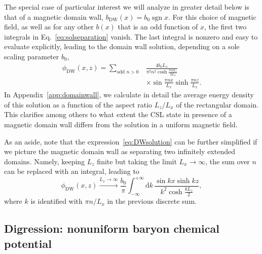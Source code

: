 \documentclass[pdflatex,iicol,sn-mathphys-num]{sn-jnl}
\let\p=\phi
\newcommand{\dd}{\text{d}}%
\newcommand{\bmag}{b}%
\begin{document}
The special case of particular interest we will analyze in greater detail below is that of a magnetic domain wall, $\bmag_\text{DW}(x)=\bmag_0\operatorname{sgn}x$. For this choice of magnetic field, as well as for any other $\bmag(x)$ that is an odd function of $x$, the first two integrals in Eq.~\eqref{eq:solseparation} vanish. The last integral is nonzero and easy to evaluate explicitly, leading to the domain wall solution, depending on a sole scaling parameter $\bmag_0$,
\begin{equation}
\begin{split}
\p_{\text{DW}}(x,z)=\sum_{\text{odd }n>0}&\frac{4\bmag_0L_x}{\pi^2n^2\cosh\frac{\pi nL_z}{2L_x}}\\
&\times\sin\frac{\pi nx}{L_x}\sinh\frac{\pi nz}{L_x}.
\end{split}
\label{eq:DWsolution}
\end{equation}
In Appendix~\ref{app:domainwall}, we calculate in detail the average energy density of this solution as a function of the aspect ratio $L_z/L_x$ of the rectangular domain. This clarifies among others to what extent the CSL state in presence of a magnetic domain wall differs from the solution in a uniform magnetic field.

As an aside, note that the expression~\eqref{eq:DWsolution} can be further simplified if we picture the magnetic domain wall as separating two infinitely extended domains. Namely, keeping $L_z$ finite but taking the limit $L_x\to\infty$, the sum over $n$ can be replaced with an integral, leading to
\begin{equation}
\p_{\text{DW}}(x,z)\xrightarrow{L_x\to\infty}\frac{\bmag_0}{\pi}\int_{-\infty}^{+\infty}\dd k\,\frac{\sin kx\sinh kz}{k^2\cosh\frac{kL_z}2},
\end{equation}
where $k$ is identified with $\pi n/L_x$ in the previous discrete sum.


\subsection{Digression: nonuniform baryon chemical potential}
\label{subsec:nonuniformBzeroMdigression}
\end{document}
